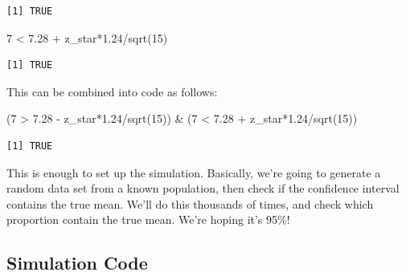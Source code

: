 \documentclass[
  letterpaper,
  DIV=11,
  numbers=noendperiod,
  oneside]{scrreprt}
\newenvironment{Shaded}{\begin{snugshade}}{\end{snugshade}}
\newcommand{\DecValTok}[1]{\textcolor[rgb]{0.68,0.00,0.00}{#1}}
\newcommand{\FloatTok}[1]{\textcolor[rgb]{0.68,0.00,0.00}{#1}}
\newcommand{\FunctionTok}[1]{\textcolor[rgb]{0.28,0.35,0.67}{#1}}
\newcommand{\NormalTok}[1]{\textcolor[rgb]{0.00,0.23,0.31}{#1}}
\newcommand{\SpecialCharTok}[1]{\textcolor[rgb]{0.37,0.37,0.37}{#1}}
\begin{document}
\begin{verbatim}
[1] TRUE
\end{verbatim}

\begin{Shaded}
\begin{Highlighting}[]
\DecValTok{7} \SpecialCharTok{\textless{}} \FloatTok{7.28} \SpecialCharTok{+}\NormalTok{ z\_star}\SpecialCharTok{*}\FloatTok{1.24}\SpecialCharTok{/}\FunctionTok{sqrt}\NormalTok{(}\DecValTok{15}\NormalTok{) }
\end{Highlighting}
\end{Shaded}

\begin{verbatim}
[1] TRUE
\end{verbatim}

This can be combined into code as follows:

\begin{Shaded}
\begin{Highlighting}[]
\NormalTok{(}\DecValTok{7} \SpecialCharTok{\textgreater{}} \FloatTok{7.28} \SpecialCharTok{{-}}\NormalTok{ z\_star}\SpecialCharTok{*}\FloatTok{1.24}\SpecialCharTok{/}\FunctionTok{sqrt}\NormalTok{(}\DecValTok{15}\NormalTok{)) }\SpecialCharTok{\&}\NormalTok{ (}\DecValTok{7} \SpecialCharTok{\textless{}} \FloatTok{7.28} \SpecialCharTok{+}\NormalTok{ z\_star}\SpecialCharTok{*}\FloatTok{1.24}\SpecialCharTok{/}\FunctionTok{sqrt}\NormalTok{(}\DecValTok{15}\NormalTok{))}
\end{Highlighting}
\end{Shaded}

\begin{verbatim}
[1] TRUE
\end{verbatim}

This is enough to set up the simulation. Basically, we're going to
generate a random data set from a known population, then check if the
confidence interval contains the true mean. We'll do this thousands of
times, and check which proportion contain the true mean. We're hoping
it's 95\%!

\hypertarget{simulation-code}{%
\subsection{Simulation Code}\label{simulation-code}}
\end{document}
